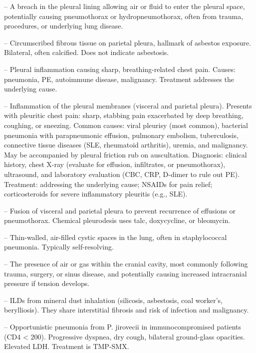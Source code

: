 -- A breach in the pleural lining allowing air or fluid to enter the pleural space, potentially causing pneumothorax or hydropneumothorax, often from trauma, procedures, or underlying lung disease.

-- Circumscribed fibrous tissue on parietal pleura, hallmark of asbestos exposure. Bilateral, often calcified. Does not indicate asbestosis.

-- Pleural inflammation causing sharp, breathing-related chest pain. Causes: pneumonia, PE, autoimmune disease, malignancy. Treatment addresses the underlying cause.

-- Inflammation of the pleural membranes (visceral and parietal pleura). Presents with pleuritic chest pain: sharp, stabbing pain exacerbated by deep breathing, coughing, or sneezing. Common causes: viral pleurisy (most common), bacterial pneumonia with parapneumonic effusion, pulmonary embolism, tuberculosis, connective tissue diseases (SLE, rheumatoid arthritis), uremia, and malignancy. May be accompanied by pleural friction rub on auscultation. Diagnosis: clinical history, chest X-ray (evaluate for effusion, infiltrates, or pneumothorax), ultrasound, and laboratory evaluation (CBC, CRP, D-dimer to rule out PE). Treatment: addressing the underlying cause; NSAIDs for pain relief; corticosteroids for severe inflammatory pleuritis (e.g., SLE).

-- Fusion of visceral and parietal pleura to prevent recurrence of effusions or pneumothorax. Chemical pleurodesis uses talc, doxycycline, or bleomycin.

-- Thin-walled, air-filled cystic spaces in the lung, often in staphylococcal pneumonia. Typically self-resolving.

-- The presence of air or gas within the cranial cavity, most commonly following trauma, surgery, or sinus disease, and potentially causing increased intracranial pressure if tension develops.

-- ILDs from mineral dust inhalation (silicosis, asbestosis, coal worker's, berylliosis). They share interstitial fibrosis and risk of infection and malignancy.

-- Opportunistic pneumonia from P. jirovecii in immunocompromised patients (CD4 < 200). Progressive dyspnea, dry cough, bilateral ground-glass opacities. Elevated LDH. Treatment is TMP-SMX.

